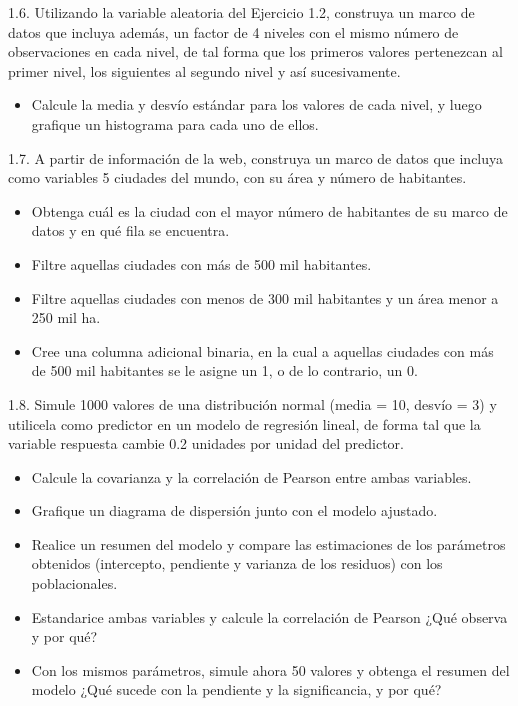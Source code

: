\documentclass[
]{book}
\providecommand{\tightlist}{%
  \setlength{\itemsep}{0pt}\setlength{\parskip}{0pt}}
\begin{document}
1.6. Utilizando la variable aleatoria del Ejercicio 1.2, construya un marco de datos que incluya además, un factor de 4 niveles con el mismo número de observaciones en cada nivel, de tal forma que los primeros valores pertenezcan al primer nivel, los siguientes al segundo nivel y así sucesivamente.

\begin{itemize}
\tightlist
\item
  Calcule la media y desvío estándar para los valores de cada nivel, y luego grafique un histograma para cada uno de ellos.
\end{itemize}

1.7. A partir de información de la web, construya un marco de datos que incluya como variables 5 ciudades del mundo, con su área y número de habitantes.

\begin{itemize}
\item
  Obtenga cuál es la ciudad con el mayor número de habitantes de su marco de datos y en qué fila se encuentra.
\item
  Filtre aquellas ciudades con más de 500 mil habitantes.
\item
  Filtre aquellas ciudades con menos de 300 mil habitantes y un área menor a 250 mil ha.
\item
  Cree una columna adicional binaria, en la cual a aquellas ciudades con más de 500 mil habitantes se le asigne un 1, o de lo contrario, un 0.
\end{itemize}

1.8. Simule 1000 valores de una distribución normal (media = 10, desvío = 3) y utilicela como predictor en un modelo de regresión lineal, de forma tal que la variable respuesta cambie 0.2 unidades por unidad del predictor.

\begin{itemize}
\item
  Calcule la covarianza y la correlación de Pearson entre ambas variables.
\item
  Grafique un diagrama de dispersión junto con el modelo ajustado.
\item
  Realice un resumen del modelo y compare las estimaciones de los parámetros obtenidos (intercepto, pendiente y varianza de los residuos) con los poblacionales.
\item
  Estandarice ambas variables y calcule la correlación de Pearson ¿Qué observa y por qué?
\item
  Con los mismos parámetros, simule ahora 50 valores y obtenga el resumen del modelo ¿Qué sucede con la pendiente y la significancia, y por qué?
\end{itemize}
\end{document}

